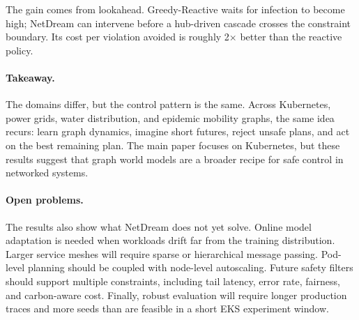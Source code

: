 The gain comes from lookahead.  Greedy-Reactive waits for infection to
become high; NetDream can intervene before a hub-driven cascade crosses
the constraint boundary.  Its cost per violation avoided is roughly
2$\times$ better than the reactive policy.

\paragraph{Takeaway.}
The domains differ, but the control pattern is the same.  Across
Kubernetes, power grids, water distribution, and epidemic mobility
graphs, the same idea recurs: learn graph dynamics, imagine short
futures, reject unsafe plans, and act on the best remaining plan.  The
main paper focuses on Kubernetes, but these results suggest that graph
world models are a broader recipe for safe control in networked systems.

\paragraph{Open problems.}
The results also show what NetDream does not yet solve.  Online model
adaptation is needed when workloads drift far from the training
distribution.  Larger service meshes will require sparse or hierarchical
message passing.  Pod-level planning should be coupled with node-level
autoscaling.  Future safety filters should support multiple constraints,
including tail latency, error rate, fairness, and carbon-aware cost.
Finally, robust evaluation will require longer production traces and more
seeds than are feasible in a short EKS experiment window.
